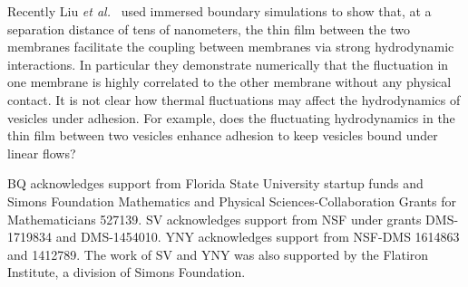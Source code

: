 \documentclass[prf,superscriptaddress,showpacs]{revtex4-1}
\begin{document}
Recently Liu {\em et al.}~\cite{LiuChuNewbyRead2018_bioRxiv} used
immersed boundary simulations to show that, at a separation distance of
tens of nanometers, the thin film between the two membranes facilitate
the coupling between membranes via strong hydrodynamic interactions. In
particular they demonstrate numerically that the fluctuation in one
membrane is highly correlated to the other membrane without any physical
contact. It is not clear how thermal fluctuations may affect the
hydrodynamics of vesicles under adhesion. For example, does the
fluctuating hydrodynamics in the thin film between two vesicles enhance
adhesion to keep vesicles bound under linear flows?

\acknowledgments

BQ acknowledges support from Florida State University startup funds and Simons Foundation Mathematics
and Physical Sciences-Collaboration Grants for Mathematicians 527139.
SV acknowledges support from NSF under grants DMS-1719834 and DMS-1454010.
YNY acknowledges support from NSF-DMS 1614863 and 1412789. 
The work of SV and YNY was also supported by the Flatiron Institute, a division of Simons Foundation.
\end{document}
